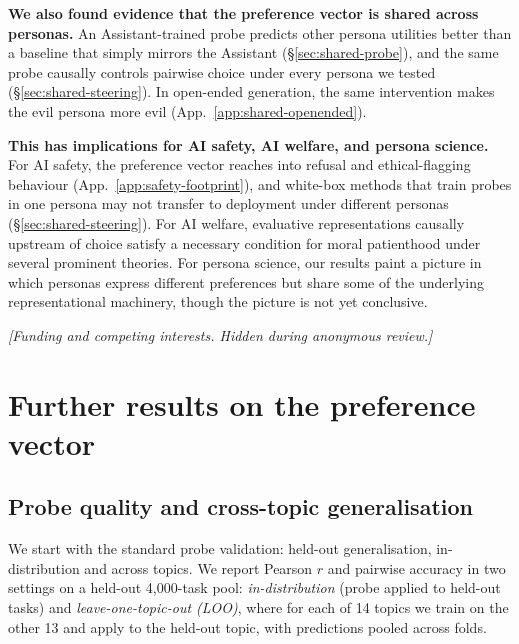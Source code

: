 \documentclass{article}
\begin{document}
\textbf{We also found evidence that the preference vector is shared across personas.} An Assistant-trained probe predicts other persona utilities better than a baseline that simply mirrors the Assistant (\S\ref{sec:shared-probe}), and the same probe causally controls pairwise choice under every persona we tested (\S\ref{sec:shared-steering}). In open-ended generation, the same intervention makes the evil persona more evil (App.~\ref{app:shared-openended}).

\textbf{This has implications for AI safety, AI welfare, and persona science.} For AI safety, the preference vector reaches into refusal and ethical-flagging behaviour (App.~\ref{app:safety-footprint}), and white-box methods that train probes in one persona may not transfer to deployment under different personas (\S\ref{sec:shared-steering}). For AI welfare, evaluative representations causally upstream of choice satisfy a necessary condition for moral patienthood under several prominent theories. For persona science, our results paint a picture in which personas express different preferences but share some of the underlying representational machinery, though the picture is not yet conclusive.

\begin{ack}
\textit{[Funding and competing interests. Hidden during anonymous review.]}
\end{ack}

\small



\appendix

\renewcommand{\topfraction}{0.9}
\renewcommand{\bottomfraction}{0.7}
\renewcommand{\textfraction}{0.07}
\renewcommand{\floatpagefraction}{0.95}

\section{Further results on the preference vector}
\label{app:evaluative}

\subsection{Probe quality and cross-topic generalisation}
\label{app:cross-topic}

We start with the standard probe validation: held-out generalisation, in-distribution and across topics. We report Pearson $r$ and pairwise accuracy in two settings on a held-out 4{,}000-task pool: \emph{in-distribution} (probe applied to held-out tasks) and \emph{leave-one-topic-out (LOO)}, where for each of 14 topics we train on the other 13 and apply to the held-out topic, with predictions pooled across folds.
\end{document}
